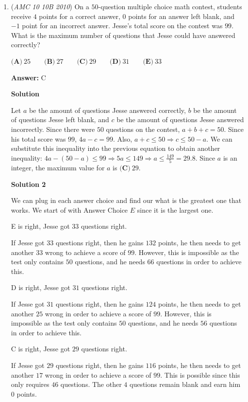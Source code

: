 \begin{enumerate}
	\item (\textit{AMC 10 10B 2010}) On a $50$-question multiple choice math contest, students receive $4$ points for a correct answer, $0$ points for an answer left blank, and $-1$ point for an incorrect answer. Jesse’s total score on the contest was $99$. What is the maximum number of questions that Jesse could have answered correctly?


 $\textbf{(A)}\ 25 \qquad \textbf{(B)}\ 27 \qquad \textbf{(C)}\ 29 \qquad \textbf{(D)}\ 31 \qquad \textbf{(E)}\ 33$

 \textbf{Answer: }C



\textbf{Solution}

Let $a$ be the amount of questions Jesse answered correctly, $b$ be the amount of questions Jesse left blank, and $c$ be the amount of questions Jesse answered incorrectly. Since there were $50$ questions on the contest, $a+b+c=50$. Since his total score was $99$, $4a-c=99$. Also, $a+c\leq50 \Rightarrow c\leq50-a$. We can substitute this inequality into the previous equation to obtain another inequality: $4a-(50-a)\leq99 \Rightarrow 5a\leq149 \Rightarrow a\leq \frac{149}5=29.8$. Since $a$ is an integer, the maximum value for $a$ is $\boxed{\textbf{(C)}\ 29}$.

 



\textbf{Solution 2}

We can plug in each answer choice and find our what is the greatest one that works. We start of with Answer Choice $E$ since it is the largest one.

 E is right, Jesse got $33$ questions right.

 If Jesse got $33$ questions right, then he gains $132$ points, he then needs to get another $33$ wrong to achieve a score of $99$. However, this is impossible as the test only contains $50$ questions, and he needs $66$ questions in order to achieve this.

 D is right, Jesse got $31$ questions right.

 If Jesse got $31$ questions right, then he gains $124$ points, he then needs to get another $25$ wrong in order to achieve a score of $99$. However, this is impossible as the test only contains $50$ questions, and he needs $56$ questions in order to achieve this.

 C is right, Jesse got $29$ questions right.

 If Jesse got $29$ questions right, then he gains $116$ points, he then needs to get another $17$ wrong in order to achieve a score of $99$. This is possible since this only requires $46$ questions. The other $4$ questions remain blank and earn him $0$ points.


\end{enumerate}
